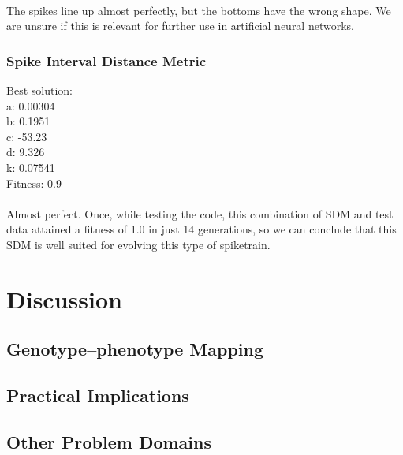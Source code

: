 \documentclass[a4paper,12pt]{article}
\begin{document}
\paragraph{}The spikes line up almost perfectly, but the bottoms have the wrong shape. We are unsure if this is relevant for further use in artificial neural networks.

\subsubsection{Spike Interval Distance Metric}
Best solution: \\
a: 0.00304 \\
b: 0.1951 \\
c: -53.23 \\
d: 9.326 \\
k: 0.07541 \\
Fitness: 0.9
\paragraph{}Almost perfect. Once, while testing the code, this combination of SDM and test data attained a fitness of 1.0 in just 14 generations, so we can conclude that this SDM is well suited for evolving this type of spiketrain.

\section{Discussion}
\subsection{Genotype--phenotype Mapping}

\subsection{Practical Implications}

\subsection{Other Problem Domains}
\end{document}
